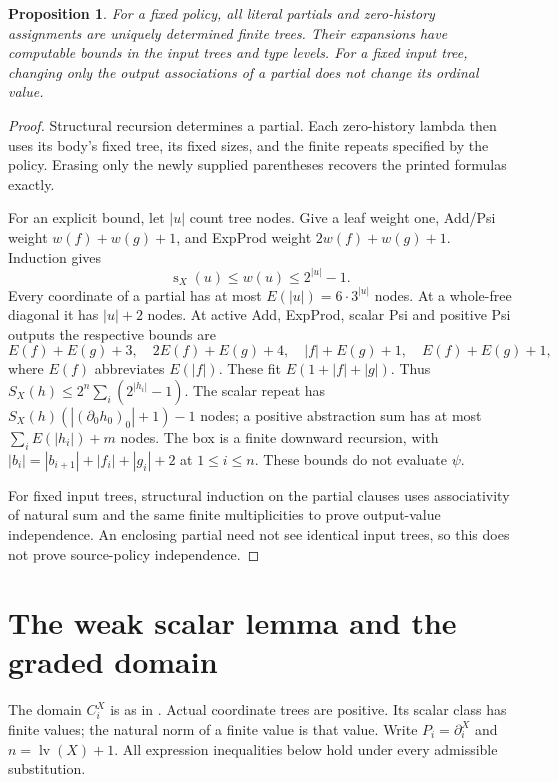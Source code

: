 \documentclass[11pt]{article}
\newtheorem{proposition}[theorem]{Proposition}
\newcommand{\lv}{\operatorname{lv}}
\newcommand{\sz}{\operatorname{s}}
\newcommand{\pa}{\partial}
\begin{document}
\begin{proposition}\label{prop:finite}
For a fixed policy, all literal partials and zero-history assignments
are uniquely determined finite trees. Their expansions have computable
bounds in the input trees and type levels. For a fixed input tree,
changing only the output associations of a partial does not change
its ordinal value.
\end{proposition}
\begin{proof}
Structural recursion determines a partial. Each zero-history lambda
then uses its body's fixed tree, its fixed sizes, and the finite
repeats specified by the policy. Erasing only the newly supplied
parentheses recovers the printed formulas exactly.

For an explicit bound, let $|u|$ count tree nodes. Give a leaf weight
one, Add/Psi weight $w(f)+w(g)+1$, and ExpProd weight
$2w(f)+w(g)+1$. Induction gives
\[
 \sz_X(u)\le w(u)\le2^{|u|}-1.
\]
Every coordinate of a partial has at most $E(|u|)=6\cdot3^{|u|}$ nodes.
At a whole-free diagonal it has $|u|+2$ nodes. At active Add, ExpProd,
scalar Psi and positive Psi outputs the respective bounds are
\[
 E(f)+E(g)+3,\quad 2E(f)+E(g)+4,\quad
 |f|+E(g)+1,\quad E(f)+E(g)+1,
\]
where $E(f)$ abbreviates $E(|f|)$. These fit $E(1+|f|+|g|)$.
Thus $S_X(h)\le2^n\sum_i(2^{|h_i|}-1)$. The scalar repeat has
$S_X(h)(|(\pa_0h_0)_0|+1)-1$ nodes; a positive abstraction sum has
at most $\sum_i E(|h_i|)+m$ nodes. The box is a finite downward
recursion, with $|b_i|=|b_{i+1}|+|f_i|+|g_i|+2$ at $1\le i\le n$.
These bounds do not evaluate $\psi$.

For fixed input trees, structural induction on the partial clauses
uses associativity of natural sum and the same finite multiplicities
to prove output-value independence. An enclosing partial need not see
identical input trees, so this does not prove source-policy independence.
\end{proof}

\section{The weak scalar lemma and the graded domain}

The domain $C_i^X$ is as in \cite[Definition~2.9]{WW}. Actual coordinate
trees are positive. Its scalar class has finite values; the natural norm
of a finite value is that value. Write $P_i=\pa_i^X$ and $n=\lv(X)+1$.
All expression inequalities below hold under every admissible substitution.
\end{document}
